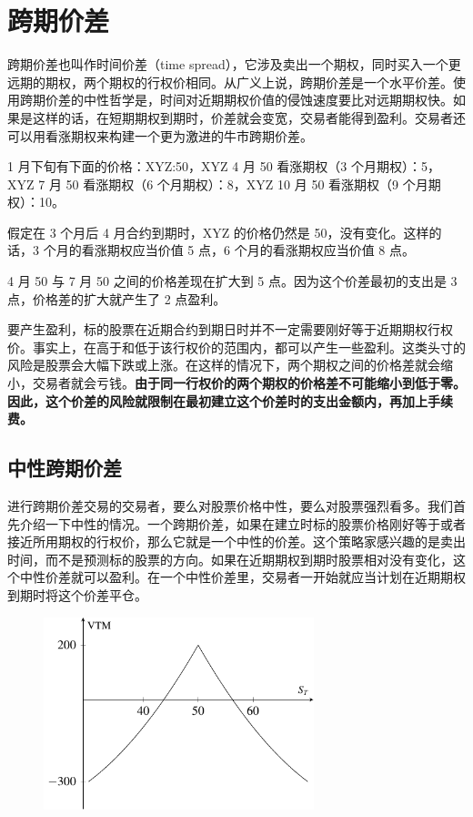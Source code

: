 \chapter{跨期价差}
跨期价差也叫作时间价差（time spread），它涉及卖出一个期权，同时买入一个更远期的期权，两个期权的行权价相同。从广义上说，跨期价差是一个水平价差。使用跨期价差的中性哲学是，时间对近期期权价值的侵蚀速度要比对远期期权快。如果是这样的话，在短期期权到期时，价差就会变宽，交易者能得到盈利。交易者还可以用看涨期权来构建一个更为激进的牛市跨期价差。

1 月下旬有下面的价格：XYZ:50，XYZ 4 月 50 看涨期权（3 个月期权）：5，XYZ 7 月 50 看涨期权（6 个月期权）：8，XYZ 10 月 50 看涨期权（9 个月期权）：10。

假定在 3 个月后 4 月合约到期时，XYZ 的价格仍然是 50，没有变化。这样的话，3 个月的看涨期权应当价值 5 点，6 个月的看涨期权应当价值 8 点。

4 月 50 与 7 月 50 之间的价格差现在扩大到 5 点。因为这个价差最初的支出是 3 点，价格差的扩大就产生了 2 点盈利。

要产生盈利，标的股票在近期合约到期日时并不一定需要刚好等于近期期权行权价。事实上，在高于和低于该行权价的范围内，都可以产生一些盈利。这类头寸的风险是股票会大幅下跌或上涨。在这样的情况下，两个期权之间的价格差就会缩小，交易者就会亏钱。\textbf{由于同一行权价的两个期权的价格差不可能缩小到低于零。因此，这个价差的风险就限制在最初建立这个价差时的支出金额内，再加上手续费。}

\section{中性跨期价差}
进行跨期价差交易的交易者，要么对股票价格中性，要么对股票强烈看多。我们首先介绍一下中性的情况。一个跨期价差，如果在建立时标的股票价格刚好等于或者接近所用期权的行权价，那么它就是一个中性的价差。这个策略家感兴趣的是卖出时间，而不是预测标的股票的方向。如果在近期期权到期时股票相对没有变化，这个中性价差就可以盈利。在一个中性价差里，交易者一开始就应当计划在近期期权到期时将这个价差平仓。

\begin{figure}[h]
    \centering
    \includegraphics[width=0.7\textwidth]{IMG/Calendar spread at near-term expiration.pdf}
    \label{fig:calendar spreads}
\end{figure}

